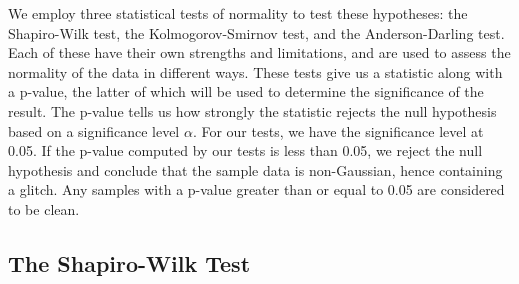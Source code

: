 \documentclass[12pt]{article}
\begin{document}
\medskip
\noindent We employ three statistical tests of normality to test these hypotheses: the Shapiro-Wilk test, the Kolmogorov-Smirnov test, and the Anderson-Darling test. Each of these have their own strengths and limitations, and are used to assess the normality of the data in different ways. These tests give us a statistic along with a p-value, the latter of which will be used to determine the significance of the result. The p-value tells us how strongly the statistic rejects the null hypothesis based on a significance level $\alpha$. For our tests, we have the significance level at 0.05. If the p-value computed by our tests is less than 0.05, we reject the null hypothesis and conclude that the sample data is non-Gaussian, hence containing a glitch. Any samples with a p-value greater than or equal to 0.05 are considered to be clean.


\medskip


\subsection{The Shapiro-Wilk Test}\label{ShapiroWilk}
\end{document}
